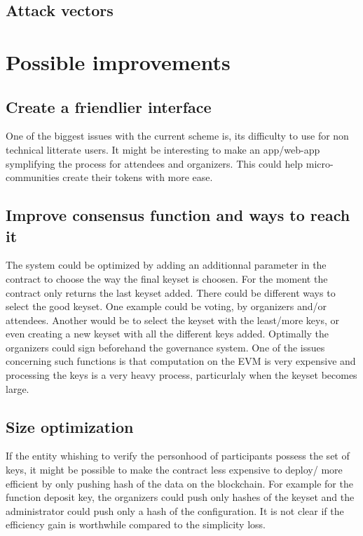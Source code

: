 \documentclass[11pt, a4paper, twoside, openright]{book} %
\begin{document}
\subsection{Attack vectors}

  
\section{Possible improvements}

\subsection{Create a friendlier interface}
One of the biggest issues with the current scheme is, its difficulty to use for non technical litterate users. It might be interesting to make an app/web-app symplifying the process for attendees and organizers. This could help micro-communities create their tokens with more ease.
\subsection{Improve consensus function and ways to reach it}
The system could be optimized by adding an additionnal parameter in the contract to choose the way the final keyset is choosen. For the moment the contract only returns the last keyset added. There could be different ways to select the good keyset. One example could be voting, by organizers and/or attendees. Another would be to select the keyset with the least/more keys, or even creating a new keyset with all the different keys added. Optimally the organizers could sign beforehand the governance system. One of the issues concerning such functions is that computation on the EVM is very expensive and processing the keys is a very heavy process, particurlaly when the keyset becomes large. 

\subsection{Size optimization}
If the entity whishing to verify the personhood of participants possess the set of keys, it might be possible to make the contract less expensive to deploy/ more efficient by only pushing hash of the data on the blockchain. For example for the function deposit key, the organizers could push only hashes of the keyset and the administrator could push only a hash of the configuration. It is not clear if the efficiency gain is worthwhile compared to the simplicity loss.
\end{document}
